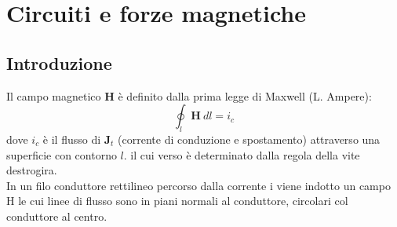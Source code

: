 \documentclass{article}
\begin{document}
\section{Circuiti e forze magnetiche}
\subsection{Introduzione}
Il campo magnetico $\mathbf{H}$ è definito dalla prima
legge di Maxwell (L. Ampere):
\[\oint_l \mathbf{H} \ dl = i_c\]
dove $i_c$ è il flusso di $\mathbf{J}_t$ (corrente di conduzione e spostamento) attraverso una superficie con contorno $l$. il cui verso è determinato dalla regola della vite destrogira.\\
In un filo conduttore rettilineo percorso
dalla corrente i viene indotto un campo H
le cui linee di flusso sono in piani normali al
conduttore, circolari col conduttore al
centro. 
\end{document}

